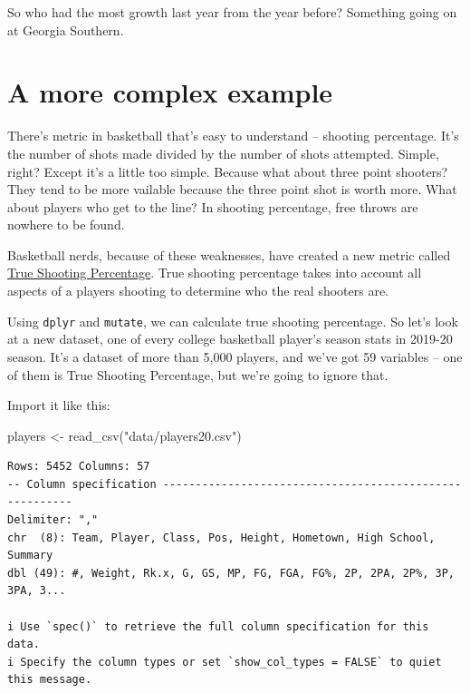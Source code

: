 \documentclass[
  letterpaper,
  DIV=11,
  numbers=noendperiod]{scrreprt}
\newenvironment{Shaded}{\begin{snugshade}}{\end{snugshade}}
\newcommand{\FunctionTok}[1]{\textcolor[rgb]{0.28,0.35,0.67}{#1}}
\newcommand{\NormalTok}[1]{\textcolor[rgb]{0.00,0.23,0.31}{#1}}
\newcommand{\OtherTok}[1]{\textcolor[rgb]{0.00,0.23,0.31}{#1}}
\newcommand{\StringTok}[1]{\textcolor[rgb]{0.13,0.47,0.30}{#1}}
\begin{document}
So who had the most growth last year from the year before? Something
going on at Georgia Southern.

\hypertarget{a-more-complex-example}{%
\section{A more complex example}\label{a-more-complex-example}}

There's metric in basketball that's easy to understand -- shooting
percentage. It's the number of shots made divided by the number of shots
attempted. Simple, right? Except it's a little too simple. Because what
about three point shooters? They tend to be more vailable because the
three point shot is worth more. What about players who get to the line?
In shooting percentage, free throws are nowhere to be found.

Basketball nerds, because of these weaknesses, have created a new metric
called
\href{https://en.wikipedia.org/wiki/True_shooting_percentage}{True
Shooting Percentage}. True shooting percentage takes into account all
aspects of a players shooting to determine who the real shooters are.

Using \texttt{dplyr} and \texttt{mutate}, we can calculate true shooting
percentage. So let's look at a new dataset, one of every college
basketball player's season stats in 2019-20 season. It's a dataset of
more than 5,000 players, and we've got 59 variables -- one of them is
True Shooting Percentage, but we're going to ignore that.

Import it like this:

\begin{Shaded}
\begin{Highlighting}[]
\NormalTok{players }\OtherTok{\textless{}{-}} \FunctionTok{read\_csv}\NormalTok{(}\StringTok{"data/players20.csv"}\NormalTok{)}
\end{Highlighting}
\end{Shaded}

\begin{verbatim}
Rows: 5452 Columns: 57
-- Column specification --------------------------------------------------------
Delimiter: ","
chr  (8): Team, Player, Class, Pos, Height, Hometown, High School, Summary
dbl (49): #, Weight, Rk.x, G, GS, MP, FG, FGA, FG%, 2P, 2PA, 2P%, 3P, 3PA, 3...

i Use `spec()` to retrieve the full column specification for this data.
i Specify the column types or set `show_col_types = FALSE` to quiet this message.
\end{verbatim}
\end{document}
